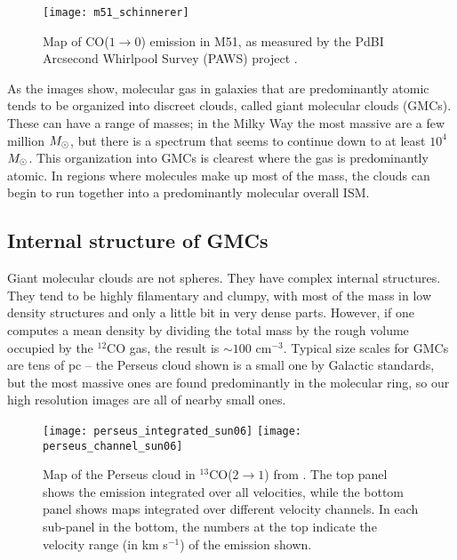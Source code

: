 \begin{figure}
\texttt{[image: m51\_schinnerer]}
\caption[Distribution of CO($1\rightarrow 0$) emission in M51]{
\label{fig:m51_schinnerer}
Map of CO($1\rightarrow 0$) emission in M51, as measured by the PdBI Arcsecond Whirlpool Survey (PAWS) project \citep{schinnerer13a}.
}
\end{figure}

As the images show, molecular gas in galaxies that are predominantly atomic tends to be organized into discreet clouds, called giant molecular clouds (GMCs). These can have a range of masses; in the Milky Way the most massive are a few million $M_{\odot}$, but there is a spectrum that seems to continue down to at least $10^4$ $M_{\odot}$. This organization into GMCs is clearest where the gas is predominantly atomic. In regions where molecules make up most of the mass, the clouds can begin to run together into a predominantly molecular overall ISM.

\subsection{Internal structure of GMCs}

Giant molecular clouds are not spheres. They have complex internal structures. They tend to be highly filamentary and clumpy, with most of the mass in low density structures and only a little bit in very dense parts. However, if one computes a mean density by dividing the total mass by the rough volume occupied by the $^{12}$CO gas, the result is $\sim 100$ cm$^{-3}$. Typical size scales for GMCs are tens of pc -- the Perseus cloud shown is a small one by Galactic standards, but the most massive ones are found predominantly in the molecular ring, so our high resolution images are all of nearby small ones.

\begin{figure}
\texttt{[image: perseus\_integrated\_sun06]}
\texttt{[image: perseus\_channel\_sun06]}
\caption[$^{13}$CO($2\rightarrow 1$) maps of Perseus]{
\label{fig:perseus_sun06}
Map of the Perseus cloud in $^{13}$CO($2\rightarrow 1$) from \citet{sun06a}. The top panel shows the emission integrated over all velocities, while the bottom panel shows maps integrated over different velocity channels. In each sub-panel in the bottom, the numbers at the top indicate the velocity range (in km s$^{-1}$) of the emission shown.
}
\end{figure}

